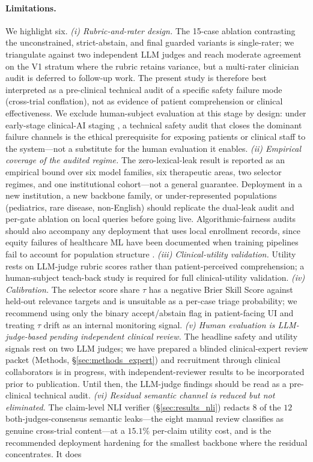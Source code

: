 \documentclass[11pt]{article}
\begin{document}
\paragraph{Limitations.}
We highlight six. \emph{(i) Rubric-and-rater design.} The 15-case ablation contrasting the unconstrained, strict-abstain, and final guarded variants is single-rater; we triangulate against two independent LLM judges and reach moderate agreement on the V1 stratum where the rubric retains variance, but a multi-rater clinician audit is deferred to follow-up work. The present study is therefore best interpreted as a pre-clinical technical audit of a specific safety failure mode (cross-trial conflation), not as evidence of patient comprehension or clinical effectiveness. We exclude human-subject evaluation at this stage by design: under early-stage clinical-AI staging \citep{vasey2022decideai}, a technical safety audit that closes the dominant failure channels is the ethical prerequisite for exposing patients or clinical staff to the system---not a substitute for the human evaluation it enables. \emph{(ii) Empirical coverage of the audited regime.} The zero-lexical-leak result is reported as an empirical bound over six model families, six therapeutic areas, two selector regimes, and one institutional cohort---not a general guarantee. Deployment in a new institution, a new backbone family, or under-represented populations \citep{unger2019recruitment,clark2019barriers,fda2022diversity,chang2024fair} (pediatrics, rare disease, non-English) should replicate the dual-leak audit and per-gate ablation on local queries before going live. Algorithmic-fairness audits should also accompany any deployment that uses local enrollment records, since equity failures of healthcare ML have been documented when training pipelines fail to account for population structure \citep{obermeyer2019dissecting}. \emph{(iii) Clinical-utility validation.} Utility rests on LLM-judge rubric scores rather than patient-perceived comprehension; a human-subject teach-back study is required for full clinical-utility validation. \emph{(iv) Calibration.} The selector score share $\tau$ has a negative Brier Skill Score against held-out relevance targets and is unsuitable as a per-case triage probability; we recommend using only the binary accept/abstain flag in patient-facing UI and treating $\tau$ drift as an internal monitoring signal. \emph{(v) Human evaluation is LLM-judge-based pending independent clinical review.} The headline safety and utility signals rest on two LLM judges; we have prepared a blinded clinical-expert review packet (Methods, \S\ref{sec:methods_expert}) and recruitment through clinical collaborators is in progress, with independent-reviewer results to be incorporated prior to publication. Until then, the LLM-judge findings should be read as a pre-clinical technical audit. \emph{(vi) Residual semantic channel is reduced but not eliminated.} The claim-level NLI verifier (\S\ref{sec:results_nli}) redacts $8$ of the $12$ both-judges-consensus semantic leaks---the eight manual review classifies as genuine cross-trial content---at a $15.1\%$ per-claim utility cost, and is the recommended deployment hardening for the smallest backbone where the residual concentrates. It does 
\end{document}
